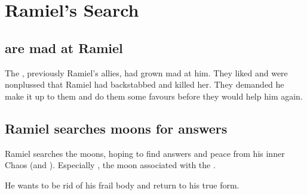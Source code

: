 \section{Ramiel's Search}





\subsection{\Vorcanths{} are mad at Ramiel}
The , previously Ramiel's allies, had grown mad at him. 
They liked \Shiaraid{} and were nonplussed that Ramiel had backstabbed and killed her. 
They demanded he make it up to them and do them some favours before they would help him again. 





\subsection{Ramiel searches moons for answers}
Ramiel searches the moons, hoping to find answers and peace from his inner Chaos (and ). 
Especially , the moon associated with the . 



He wants to be rid of his frail \human{} body and return to his true form. 

